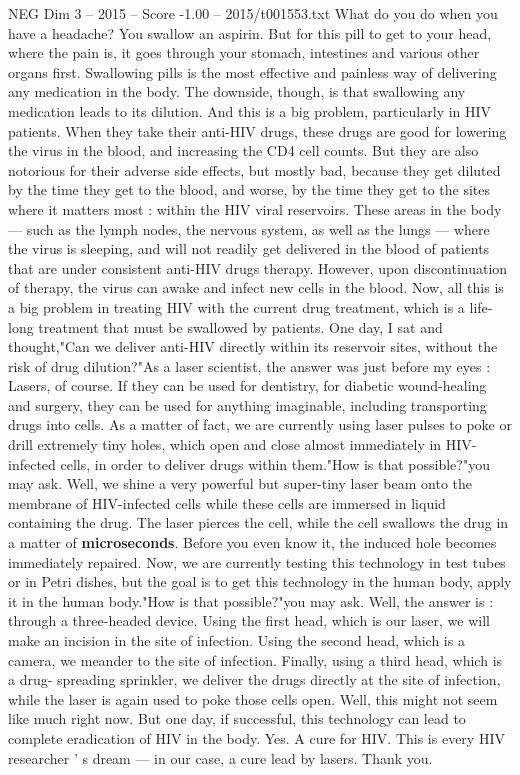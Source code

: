 \begin{textsample}{NEG Dim 3 – 2015 – Score -1.00 – 2015/t001553.txt}  \label{ex:f3_neg_050}
What do you do when you have a headache?
You swallow an aspirin.
But for this pill to get to your head, where the pain is, it goes through your stomach, intestines and various other organs first.
Swallowing pills is the most effective and painless way of delivering any medication in the body.
The downside, though, is that swallowing any medication leads to its dilution.
And this is a big problem, particularly in HIV patients.
When they take their anti-HIV drugs, these drugs are good for lowering the virus in the blood, and increasing the CD4 cell counts.
But they are also notorious for their adverse side effects, but mostly bad, because they get diluted by the time they get to the blood, and worse, by the time they get to the sites where it matters most : within the HIV viral reservoirs.
These areas in the body — such as the lymph nodes, the nervous system, as well as the lungs — where the virus is sleeping, and will not readily get delivered in the blood of patients that are under consistent anti-HIV drugs therapy.
However, upon discontinuation of therapy, the virus can awake and infect new cells in the blood.
Now, all this is a big problem in treating HIV with the current drug treatment, which is a life-long treatment that must be swallowed by patients.
One day, I sat and thought,"Can we deliver anti-HIV directly within its reservoir sites, without the risk of drug dilution?"As a laser scientist, the answer was just before my eyes : Lasers, of course.
If they can be used for dentistry, for diabetic wound-healing and surgery, they can be used for anything imaginable, including transporting drugs into cells.
As a matter of fact, we are currently using laser pulses to poke or drill extremely tiny holes, which open and close almost immediately in HIV-infected cells, in order to deliver drugs within them."How is that possible?"you may ask.
Well, we shine a very powerful but super-tiny laser beam onto the membrane of HIV-infected cells while these cells are immersed in liquid containing the drug.
The laser pierces the cell, while the cell swallows the drug in a matter of \textbf{microseconds}.
Before you even know it, the induced hole becomes immediately repaired.
Now, we are currently testing this technology in test tubes or in Petri dishes, but the goal is to get this technology in the human body, apply it in the human body."How is that possible?"you may ask.
Well, the answer is : through a three-headed device.
Using the first head, which is our laser, we will make an incision in the site of infection.
Using the second head, which is a camera, we meander to the site of infection.
Finally, using a third head, which is a drug- spreading sprinkler, we deliver the drugs directly at the site of infection, while the laser is again used to poke those cells open.
Well, this might not seem like much right now.
But one day, if successful, this technology can lead to complete eradication of HIV in the body.
Yes.
A cure for HIV.
This is every HIV researcher ' s dream — in our case, a cure lead by lasers.
Thank you.

\end{textsample}
